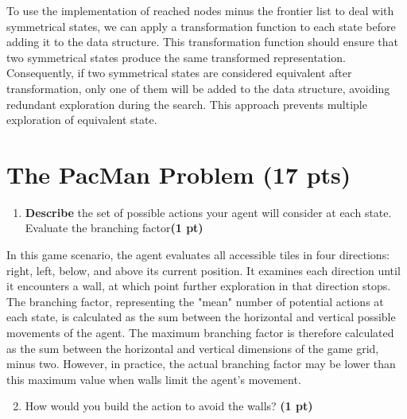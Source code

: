 \documentclass[11pt,a4paper]{../template/report}
\begin{document}
\begin{answer}
To use the implementation of reached nodes minus the frontier list to deal with symmetrical states, we can apply a transformation function to each state before adding it to the data structure. This transformation function should ensure that two symmetrical states produce the same transformed representation. Consequently, if two symmetrical states are considered equivalent after transformation, only one of them will be added to the data structure, avoiding redundant exploration during the search. This approach prevents multiple exploration of equivalent state.
\end{answer}




\section{The 
PacMan Problem (17 pts)}

\begin{enumerate}
\setcounter{enumi}{1}
\begin{enumerate}
\item \textbf{Describe} the set of possible actions your agent will consider at each state. Evaluate the branching factor\textbf{(1 pt)}
\end{enumerate}
  
\end{enumerate}

\begin{answer}
In this game scenario, the agent evaluates all accessible tiles in four directions: right, left, below, and above its current position. It examines each direction until it encounters a wall, at which point further exploration in that direction stops. The branching factor, representing the "mean" number of potential actions at each state, is calculated as the sum between the horizontal and vertical possible movements of the agent. The maximum branching factor is therefore calculated as the sum between the horizontal and vertical dimensions of the game grid, minus two. However, in practice, the actual branching factor may be lower than this maximum value when walls limit the agent's movement.
\end{answer}
\begin{enumerate}
\setcounter{enumi}{1}
\begin{enumerate}
\setcounter{enumii}{1}
    \item  How would you build the action to avoid the walls? \textbf{(1 pt)}
\end{enumerate}
  
\end{enumerate}
\end{document}

